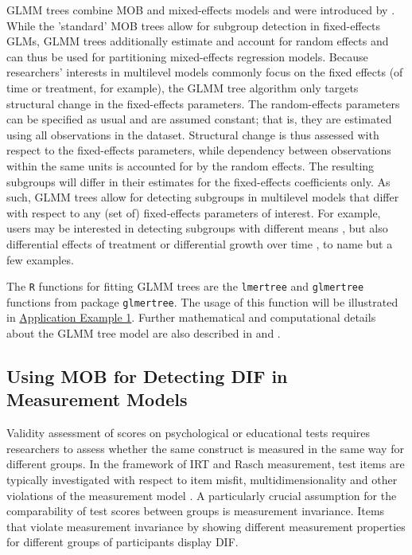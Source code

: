 \documentclass[doc,floatsintext,natbib]{apa7}
\begin{document}
GLMM trees combine MOB and mixed-effects models and were introduced by \cite{FokkySmit18}. While the 'standard' MOB trees \citep{ZeilyHoth08} allow for subgroup detection in fixed-effects GLMs, GLMM trees additionally estimate and account for random effects and can thus be used for partitioning mixed-effects regression models. Because researchers' interests in multilevel models commonly focus on the fixed effects (of time or treatment, for example), the GLMM tree algorithm only targets structural change in the fixed-effects parameters. The random-effects parameters can be specified as usual and are assumed constant; that is, they are estimated using all observations in the dataset. Structural change is thus assessed with respect to the fixed-effects parameters, while dependency between observations within the same units is accounted for by the random effects. The resulting subgroups will differ in their estimates for the fixed-effects coefficients only. As such, GLMM trees allow for detecting subgroups in multilevel models that differ with respect to any (set of) fixed-effects parameters of interest. For example, users may be interested in detecting subgroups with different means \citep{FokkyEdbr21}, but also differential effects of treatment \citep{FokkySmit18} or differential growth over time \citep{FokkyZeil23}, to name but a few examples. 

The \texttt{R} functions for fitting GLMM trees are the \texttt{lmertree} and \texttt{glmertree} functions from package \texttt{glmertree}. The usage of this function will be illustrated in \hyperref[sec:TutorialMixed]{Application Example 1}. Further mathematical and computational details about the GLMM tree model are also described in \cite{FokkySmit18} and \cite{FokkyZeil23}. 



\subsection{Using MOB for Detecting DIF in Measurement Models}

Validity assessment of scores on psychological or educational tests requires researchers to assess whether the same construct is measured in the same way for different groups. In the framework of IRT and Rasch measurement, test items are typically investigated with respect to item misfit, multidimensionality and other violations of the measurement model \citep[cf., for example][for an introduction]{DebStrZei:2022:CRC}. A particularly crucial assumption for the comparability of test scores between groups is measurement invariance. Items that violate measurement invariance by showing different measurement properties for different groups of participants display DIF.
\end{document}
